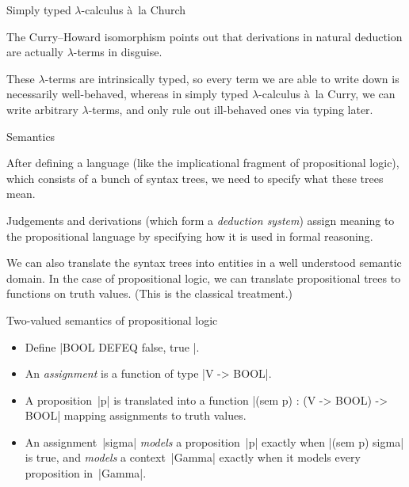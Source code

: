 \documentclass[t,compress,hyperref={hidelinks}]{beamer}
\begin{document}
\begin{frame}{Simply typed $\lambda$-calculus à~la Church}

The Curry--Howard isomorphism points out that derivations in natural deduction are actually $\lambda$-terms in disguise.

These $\lambda$-terms are intrinsically typed, so every term we are able to write down is necessarily well-behaved, whereas in simply typed $\lambda$-calculus à~la Curry, we can write arbitrary $\lambda$-terms, and only rule out ill-behaved ones via typing later.

\end{frame}

\begin{frame}{Semantics}

After defining a language (like the implicational fragment of propositional logic), which consists of a bunch of syntax trees, we need to specify what these trees mean.

Judgements and derivations (which form a \emph{deduction system}) assign meaning to the propositional language by specifying how it is used in formal reasoning.

We can also translate the syntax trees into entities in a well understood semantic domain.
In the case of propositional logic, we can translate propositional trees to functions on truth values. (This is the classical treatment.)

\end{frame}

\begin{frame}{Two-valued semantics of propositional logic}

\begin{itemize}

\item Define |BOOL DEFEQ { false, true }|.

\item An \emph{assignment} is a function of type |V -> BOOL|.

\item A proposition~|p| is translated into a function |(sem p) : (V -> BOOL) -> BOOL| mapping assignments to truth values.

\item An assignment~|sigma| \emph{models} a proposition~|p| exactly when |(sem p) sigma| is true, and \emph{models} a context~|Gamma| exactly when it models every proposition in~|Gamma|.

\end{itemize}

\end{frame}
\end{document}
